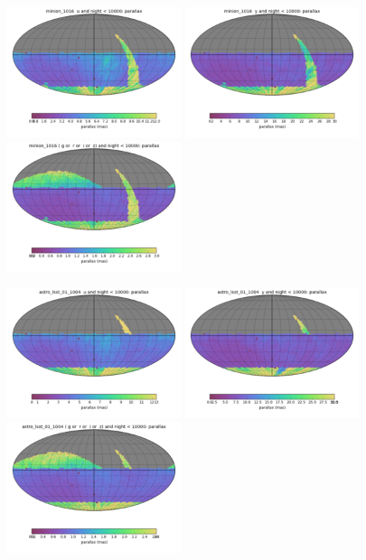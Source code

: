 \begin{figure}[ht]
  \begin{center}
  \includegraphics[width=2.0in]{./figs/milkyway/astromPanels/MW_Astrom_paError_Baseline_u_map.png}
  \includegraphics[width=2.0in]{./figs/milkyway/astromPanels/MW_Astrom_paError_Baseline_y_map.png}
  \includegraphics[width=2.0in]{./figs/milkyway/astromPanels/MW_Astrom_paError_Baseline_10y_map.png}
  \end{center}
  \begin{center}
  \includegraphics[width=2.0in]{./figs/milkyway/astromPanels/MW_Astrom_paError_wfdPlane_u_map.png}
  \includegraphics[width=2.0in]{./figs/milkyway/astromPanels/MW_Astrom_paError_wfdPlane_y_map.png}
  \includegraphics[width=2.0in]{./figs/milkyway/astromPanels/MW_Astrom_paError_wfdPlane_10y_map.png}
  \end{center}


\end{figure}
